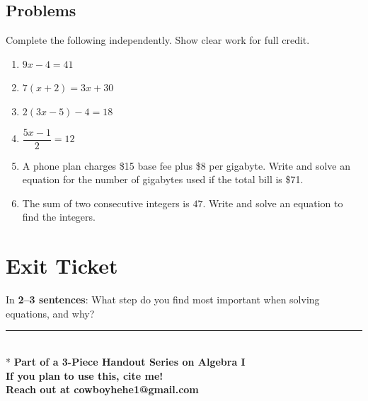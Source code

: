 \documentclass[11pt]{article}
\begin{document}

\begin{redbox}

\section{Problems}

Complete the following independently. Show clear work for full credit.

\begin{enumerate}[leftmargin=1.5em,label=\textbf{\arabic*.}]

\item $9x-4=41$

\item $7(x+2)=3x+30$

\item $2(3x-5)-4=18$

\item $\dfrac{5x-1}{2}=12$

\item A phone plan charges \$15 base fee plus \$8 per gigabyte.  
Write and solve an equation for the number of gigabytes used if the total bill is \$71.

\item The sum of two consecutive integers is $47$.  
Write and solve an equation to find the integers.

\end{enumerate}

\end{redbox}
\section*{Exit Ticket}

In \textbf{2--3 sentences}: What step do you find most important when solving equations, and why?

\vspace{0.8in}
\hrule \\*
\textbf{Part of a 3-Piece Handout Series on Algebra I} \\
\textbf{If you plan to use this, cite me!} \\
\textbf{Reach out at cowboyhehe1@gmail.com}
\end{document}
